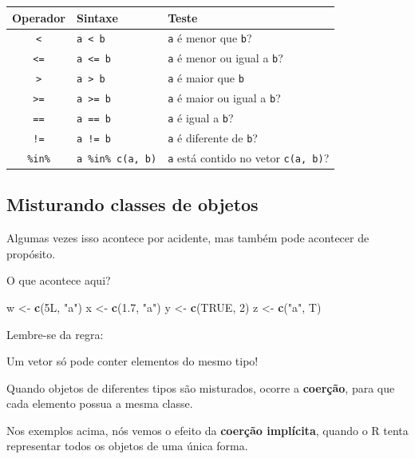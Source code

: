 \documentclass[10pt,a4paper]{book}
\newenvironment{Shaded}{\begin{snugshade}}{\end{snugshade}}
\newcommand{\KeywordTok}[1]{\textcolor[rgb]{0.13,0.29,0.53}{\textbf{#1}}}
\newcommand{\DecValTok}[1]{\textcolor[rgb]{0.00,0.00,0.81}{#1}}
\newcommand{\FloatTok}[1]{\textcolor[rgb]{0.00,0.00,0.81}{#1}}
\newcommand{\StringTok}[1]{\textcolor[rgb]{0.31,0.60,0.02}{#1}}
\newcommand{\OtherTok}[1]{\textcolor[rgb]{0.56,0.35,0.01}{#1}}
\newcommand{\NormalTok}[1]{#1}
\begin{document}
\begin{longtable}[]{@{}cll@{}}
\toprule
Operador & Sintaxe & Teste\tabularnewline
\midrule
\endhead
\texttt{\textless{}} & \texttt{a\ \textless{}\ b} & \texttt{a} é menor
que \texttt{b}?\tabularnewline
\texttt{\textless{}=} & \texttt{a\ \textless{}=\ b} & \texttt{a} é menor
ou igual a \texttt{b}?\tabularnewline
\texttt{\textgreater{}} & \texttt{a\ \textgreater{}\ b} & \texttt{a} é
maior que \texttt{b}\tabularnewline
\texttt{\textgreater{}=} & \texttt{a\ \textgreater{}=\ b} & \texttt{a} é
maior ou igual a \texttt{b}?\tabularnewline
\texttt{==} & \texttt{a\ ==\ b} & \texttt{a} é igual a
\texttt{b}?\tabularnewline
\texttt{!=} & \texttt{a\ !=\ b} & \texttt{a} é diferente de
\texttt{b}?\tabularnewline
\texttt{\%in\%} & \texttt{a\ \%in\%\ c(a,\ b)} & \texttt{a} está contido
no vetor \texttt{c(a,\ b)}?\tabularnewline
\bottomrule
\end{longtable}

\subsection{Misturando classes de
objetos}\label{misturando-classes-de-objetos}

Algumas vezes isso acontece por acidente, mas também pode acontecer de
propósito.

O que acontece aqui?

\begin{Shaded}
\begin{Highlighting}[]
\NormalTok{w <-}\StringTok{ }\KeywordTok{c}\NormalTok{(5L, }\StringTok{"a"}\NormalTok{)}
\NormalTok{x <-}\StringTok{ }\KeywordTok{c}\NormalTok{(}\FloatTok{1.7}\NormalTok{, }\StringTok{"a"}\NormalTok{)}
\NormalTok{y <-}\StringTok{ }\KeywordTok{c}\NormalTok{(}\OtherTok{TRUE}\NormalTok{, }\DecValTok{2}\NormalTok{)}
\NormalTok{z <-}\StringTok{ }\KeywordTok{c}\NormalTok{(}\StringTok{"a"}\NormalTok{, T)}
\end{Highlighting}
\end{Shaded}

Lembre-se da regra:

Um vetor só pode conter elementos do mesmo tipo!

Quando objetos de diferentes tipos são misturados, ocorre a
\textbf{coerção}, para que cada elemento possua a mesma classe.

Nos exemplos acima, nós vemos o efeito da \textbf{coerção implícita},
quando o R tenta representar todos os objetos de uma única forma.
\end{document}
